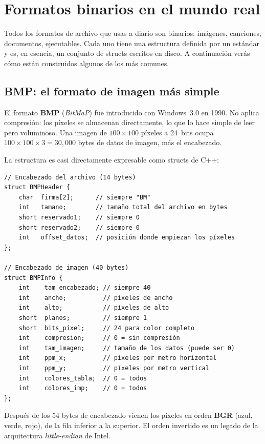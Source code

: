 \documentclass[12pt, oneside]{article}
\begin{document}
\section{Formatos binarios en el mundo real}

Todos los formatos de archivo que usas a diario son binarios: imágenes,
canciones, documentos, ejecutables.  Cada uno tiene una estructura definida
por un estándar y es, en esencia, un conjunto de structs escritos en disco.
A continuación verás cómo están construidos algunos de los más comunes.

\subsection{BMP: el formato de imagen más simple}

El formato \textbf{BMP} (\textit{BitMaP}) fue introducido con Windows~3.0
en 1990.  No aplica compresión: los píxeles se almacenan directamente,
lo que lo hace simple de leer pero voluminoso.  Una imagen de
$100\times100$ píxeles a 24~bits ocupa $100\times100\times3=30{,}000$
bytes de datos de imagen, más el encabezado.

La estructura es casi directamente expresable como structs de C++:

\begin{verbatim}
// Encabezado del archivo (14 bytes)
struct BMPHeader {
    char  firma[2];      // siempre "BM"
    int   tamano;        // tamaño total del archivo en bytes
    short reservado1;    // siempre 0
    short reservado2;    // siempre 0
    int   offset_datos;  // posición donde empiezan los píxeles
};

// Encabezado de imagen (40 bytes)
struct BMPInfo {
    int    tam_encabezado; // siempre 40
    int    ancho;          // píxeles de ancho
    int    alto;           // píxeles de alto
    short  planos;         // siempre 1
    short  bits_pixel;     // 24 para color completo
    int    compresion;     // 0 = sin compresión
    int    tam_imagen;     // tamaño de los datos (puede ser 0)
    int    ppm_x;          // píxeles por metro horizontal
    int    ppm_y;          // píxeles por metro vertical
    int    colores_tabla;  // 0 = todos
    int    colores_imp;    // 0 = todos
};
\end{verbatim}

Después de los 54 bytes de encabezado vienen los píxeles en orden
\textbf{BGR} (azul, verde, rojo), de la fila inferior a la superior.
El orden invertido es un legado de la arquitectura \textit{little-endian}
de Intel.
\end{document}
